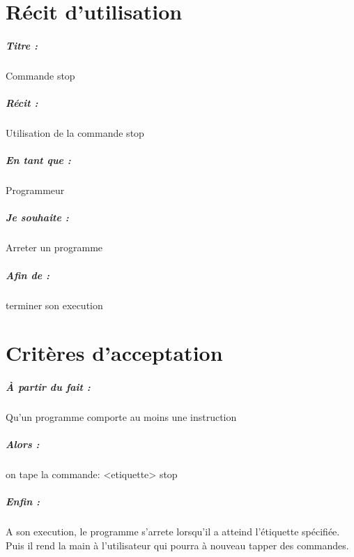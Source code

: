 \documentclass[12pt,a5paper, notitle, oneside]{report}
\begin{document}
    \chapter*{Récit d'utilisation}

    \paragraph{Titre : } Commande stop
    \paragraph{Récit : } Utilisation de la commande stop
    \paragraph{En tant que : } Programmeur
    \paragraph{Je souhaite : } Arreter un programme
    \paragraph{Afin de : } terminer son execution 
    \newpage

    \chapter*{Critères d'acceptation}

    \paragraph{À partir du fait : } Qu'un programme comporte au moins une instruction
    \paragraph{Alors : } on tape la commande: <etiquette> stop
    \paragraph{Enfin : } A son execution, le programme s'arrete lorsqu'il a atteind l'étiquette spécifiée.
			      Puis il rend la main à l'utilisateur qui pourra à nouveau tapper des commandes.
\end{document}
